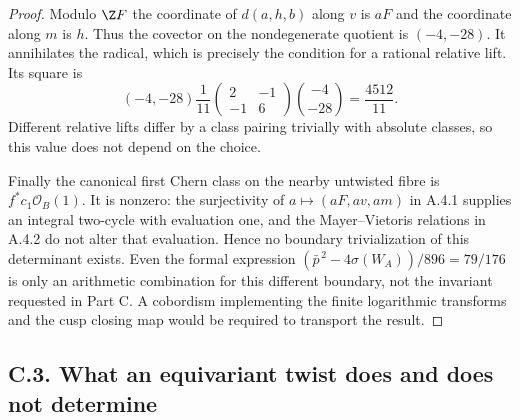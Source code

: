 \begin{proof}
Modulo $\Z F$ the coordinate of $d(a,h,b)$ along $v$ is $aF$
and the coordinate along $m$ is $h$. Thus the covector on the
nondegenerate quotient is $(-4,-28)$. It annihilates the radical,
which is precisely the condition for a rational relative lift.
Its square is
\[
 (-4,-28)\frac1{11}
 \begin{pmatrix}2&-1\\-1&6\end{pmatrix}
 \binom{-4}{-28}=\frac{4512}{11}.
\]
Different relative lifts differ by a class pairing trivially with
absolute classes, so this value does not depend on the choice.

Finally the canonical first Chern class on the nearby untwisted
fibre is $f^*c_1\mathcal O_B(1)$. It is nonzero: the surjectivity of
$a\mapsto(aF,av,am)$ in A.4.1 supplies an integral two-cycle with
evaluation one, and the Mayer--Vietoris relations in A.4.2 do not
alter that evaluation. Hence no boundary trivialization of this
determinant exists. Even the formal expression
$(\bar p^{\,2}-4\sigma(W_A))/896=79/176$ is only an arithmetic
combination for this different boundary, not the invariant requested
in Part C. A cobordism implementing the finite logarithmic transforms
and the cusp closing map would be required to transport the result.
\end{proof}

\subsection{C.3. What an equivariant twist does and does not determine}

